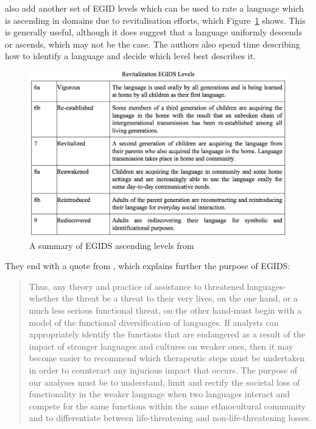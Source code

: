 \citet{lewis2010assessing} also add another set of EGID levels which can be used to rate a language which is ascending in domains due to revitalisation efforts, which Figure~\ref{fig:egids-up} shows. This is generally useful, although it does suggest that a language uniformly descends or ascends, which may not be the case. The authors also spend time describing how to identify a language and decide which level best describes it.

\begin{figure}
 \centering
 \includegraphics[width=.8\textwidth]{img/egids-up.png}
 \caption{A summary of EGIDS ascending levels from \citep{lewis2010assessing}}
 \label{fig:egids-up}
\end{figure}

They end with a quote from \citet{fishman2001can}, which explains further the purpose of EGIDS:

\begin{quote}
Thus, any theory and practice of assistance to threatened languages-whether the threat be a threat to their very lives, on the one hand, or a much less serious functional threat, on  the  other  hand-must  begin  with  a  model  of  the  functional  diversification  of languages. If analysts can appropriately identify the functions that are endangered as a result of the impact of stronger languages and cultures on weaker ones, then it may become easier to recommend which therapeutic steps must be undertaken in order to counteract any injurious impact that occurs. The purpose of our analyses must be to understand, limit and rectify the societal loss of functionality in the weaker language when  two  languages  interact  and  compete  for  the  same  functions within  the  same
ethnocultural  community  and  to  differentiate  between  life-threatening  and  non-life-threatening losses.
\end{quote}

